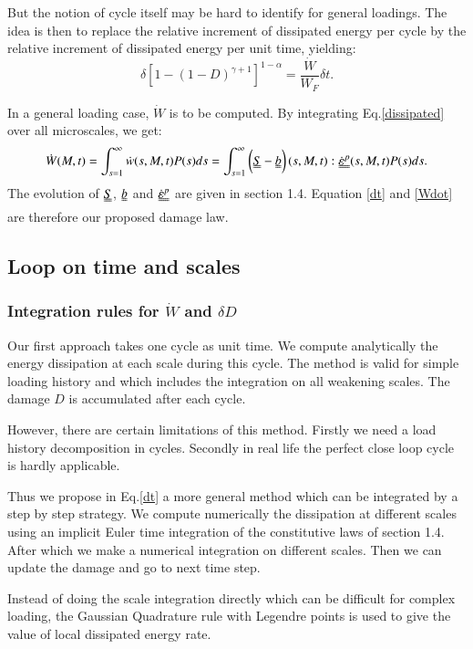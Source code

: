 \documentclass[3p,times,procedia,number]{elsarticle}
\begin{document}
But the notion of cycle itself may be hard to identify for general loadings. The idea is then to replace the relative increment of dissipated energy per cycle by the relative increment of dissipated energy per unit time, yielding:
\begin{equation}
	\delta [1-(1-D)^{\gamma+1}]^{1-\alpha}=\dfrac{\dot{W}}{W_F}\delta t.
	\label{dt}
\end{equation}

In a general loading case, $\dot{W}$ is to be computed. By integrating Eq.\eqref{dissipated} over all microscales, we get:
\begin{equation}\dot{W}(M,t)=\int_{s=1}^{\infty}\dot{w}(s,M,t)P(s)ds=\int_{s=1}^{\infty}\left(\uuline{S}-\uuline{b} \right) (s,M,t):\uuline{\dot{\varepsilon}^p}(s,M,t)P(s)ds.\label{Wdot}
\end{equation}
The evolution of $\uuline{S}$, $\uuline{b}$ and $\uuline{\dot{\varepsilon}^p}$ are given in section 1.4. Equation \eqref{dt} and \eqref{Wdot} are therefore our proposed damage law.

\subsection{Loop on time and scales}
\subsubsection{Integration rules for $\dot{W}$ and $\delta D$}
Our first approach takes one cycle as unit time. We compute analytically the energy dissipation at each scale during this cycle. The method is valid for simple loading history and which includes the integration on all weakening scales. The damage $D$ is accumulated after each cycle.

However, there are certain limitations of this method. Firstly we need a load history decomposition in cycles. Secondly in real life the perfect close loop cycle is hardly applicable.

Thus we propose in Eq.\eqref{dt} a more general method which can be integrated by a step by step strategy. We compute numerically the dissipation at different scales using an implicit Euler time integration of the constitutive laws of section 1.4. After which we make a numerical integration on different scales. Then we can update the damage and go to next time step. 

Instead of doing the scale integration directly which can be difficult for complex loading, the Gaussian Quadrature rule with Legendre points is used to give the value of local dissipated energy rate.
\end{document}

